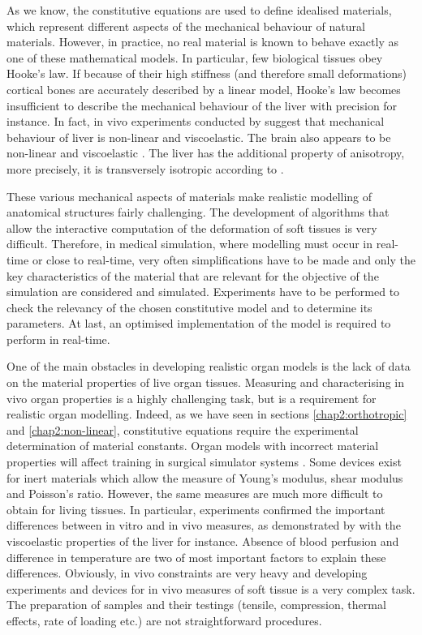 As we know, \OFF the constitutive equations are used to define idealised materials, which represent different aspects of the mechanical behaviour of natural materials. \ON However, in practice, \OFF no real material is known to behave exactly as one of these mathematical models. In particular, few biological tissues obey Hooke's law. If because of their high stiffness (and therefore small deformations) cortical bones are accurately described by a linear model, Hooke's law becomes insufficient to describe the mechanical behaviour of the liver with precision for instance. In fact, in vivo experiments conducted by \cite{Melvin73} suggest that mechanical behaviour of liver is non-linear and viscoelastic. The brain also appears to be non-linear and viscoelastic \citep{Miller97}. The liver has the additional property of anisotropy, more precisely, it is transversely isotropic according to \cite{Chui07}. 

These various mechanical aspects of materials make realistic modelling of anatomical structures fairly challenging. \ON The development of algorithms that allow the interactive computation of the deformation of soft tissues is very difficult. Therefore, \OFF in medical simulation, where modelling must occur in real-time or close to real-time, very often simplifications have to be made \ON and only the key characteristics of the material that are relevant for the objective of the simulation are considered and simulated. Experiments have to be performed to check the relevancy of the chosen constitutive model and to determine its parameters. At last, an optimised implementation of the model is required to perform in real-time.

\OFF One of the main obstacles in developing realistic organ models is the lack of data on the material properties of live organ tissues. Measuring and characterising in vivo organ properties is a highly challenging task, but is a requirement for realistic organ modelling. Indeed, as we have seen in sections \ref{chap2:orthotropic} and \ref{chap2:non-linear}, constitutive equations require the experimental determination of material constants. Organ models with incorrect material properties will affect training in surgical simulator systems \citep{Sedef06}. \ON Some devices exist for inert materials which allow the measure of Young's modulus, shear modulus and Poisson's ratio. However, the same measures are much more difficult to obtain for living tissues. In particular, experiments confirmed the important differences between in vitro and in vivo measures, as demonstrated by \cite{Kerdok06} with the viscoelastic properties of the liver for instance. Absence of blood perfusion and difference in temperature are two of most important factors to explain these differences. Obviously, in vivo constraints are very heavy and developing experiments and devices for in vivo measures of soft tissue is a very complex task. The preparation of samples and their testings (tensile, compression, thermal effects, rate of loading etc.) are not straightforward procedures.

